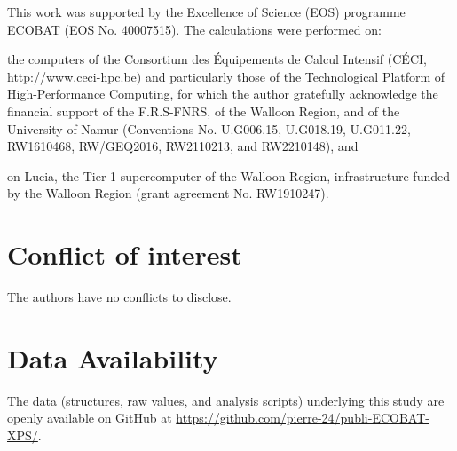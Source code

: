 \documentclass[journal=jpccck,manuscript=article]{achemso}
\begin{document}
\begin{acknowledgement}
	This work was supported by the Excellence of Science (EOS) programme  ECOBAT (EOS No. 40007515). 
	The calculations were performed on: \begin{inparaenum}[(i)]
	\item the computers of the Consortium des \'{E}quipements de Calcul Intensif (C\'{E}CI, \url{http://www.ceci-hpc.be}) and particularly those of the Technological Platform of High-Performance Computing, for which the author gratefully acknowledge the financial support of the F.R.S-FNRS, of the Walloon Region, and of the University of Namur (Conventions No.  U.G006.15, U.G018.19, U.G011.22, RW1610468, RW/GEQ2016, RW2110213, and RW2210148), and
	\item on Lucia, the Tier-1 supercomputer of the Walloon Region, infrastructure funded by the Walloon Region (grant agreement No. RW1910247).
	\end{inparaenum} 
\end{acknowledgement}

\section*{Conflict of interest}

The authors have no conflicts to disclose.

%

\section*{Data Availability}

The data (structures, raw values, and analysis scripts) underlying this study are openly available on GitHub at \url{https://github.com/pierre-24/publi-ECOBAT-XPS/}.


	
\end{document}
